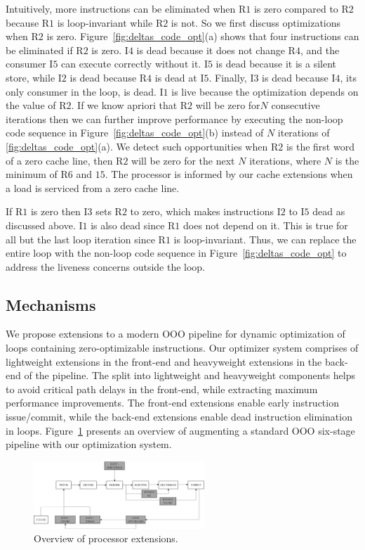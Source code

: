 Intuitively, more instructions can be eliminated when R$1$ is zero compared to R$2$ because R$1$ is loop-invariant while R$2$ is not.  So we first discuss optimizations when R$2$ is zero.  Figure~\ref{fig:deltas_code_opt}(a) shows that four instructions can be eliminated if R$2$ is zero.  I$4$ is dead because it does not change R$4$, and the consumer I$5$ can execute correctly without it.  I$5$ is dead because it is a silent store, while I$2$ is dead because R$4$ is dead at I$5$.  Finally, I$3$ is dead because I$4$,  its only consumer in the loop,  is dead.  I$1$ is live because the optimization depends on the value of R$2$.  If we know apriori that R$2$ will be zero for$N$ consecutive iterations then we can further improve performance by executing the non-loop code sequence in Figure~\ref{fig:deltas_code_opt}(b)  instead of $N$ iterations of \ref{fig:deltas_code_opt}(a).   We detect such opportunities when R$2$ is the first word of a zero cache line, then R$2$ will be zero for the next $N$ iterations, where $N$ is the minimum of R$6$ and $15$.  The processor is informed by our cache extensions when a load is serviced from a zero cache line.

If R$1$ is zero then I$3$ sets R$2$ to zero, which makes instructions I$2$ to I$5$ dead as discussed above.  I$1$ is also dead since R$1$ does not depend on it.  This is true for all but the last loop iteration since R$1$ is loop-invariant.  Thus, we can replace the entire loop with the non-loop code sequence in Figure~\ref{fig:deltas_code_opt} to address the liveness concerns outside the loop.  

\subsection{Mechanisms}
We propose extensions to a modern OOO pipeline for dynamic optimization of loops containing zero-optimizable instructions.  Our optimizer system comprises of lightweight extensions in the front-end and heavyweight extensions in the back-end of the pipeline.  The split into lightweight and heavyweight components helps to avoid critical path delays in the front-end, while extracting maximum performance improvements.  The front-end extensions enable early instruction issue/commit, while the back-end extensions enable dead instruction elimination in loops.  Figure~\ref{fig:opt_pipeline} presents an overview of augmenting a standard OOO six-stage pipeline with our optimization system.

\begin{figure}
\centering
\includegraphics[height=1in]{Figures/pipeline.png}
\caption{Overview of processor extensions.}
\label{fig:opt_pipeline}
\end{figure}

